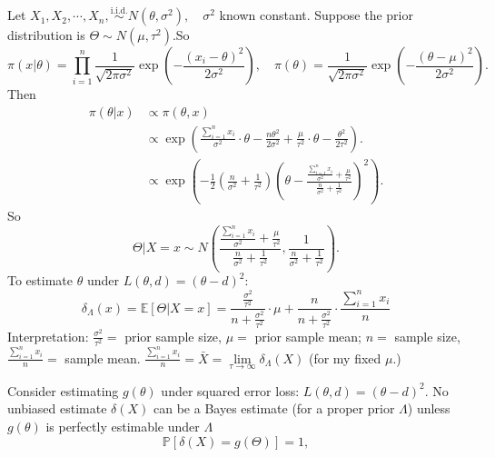 \documentclass[a4paper]{article}
\begin{document}
\begin{eg}
	Let $X_1,X_2,\cdots,X_n,\stackrel{\text{i.i.d.}}{\sim} N(\theta,\sigma^2), \quad \sigma^2$ known constant. Suppose the prior distribution is $\Theta \sim N(\mu, \tau^2)$.So
	\begin{equation*}
		\pi(x|\theta) = \prod\limits_{i=1}^n \frac{1}{\sqrt{2 \pi \sigma^2}} \exp\left(-\frac{(x_i-\theta)^2}{2\sigma^2}\right), \quad \pi(\theta) = \frac{1}{\sqrt{2 \pi \sigma^2}} \exp\left(-\frac{(\theta-\mu)^2}{2\sigma^2}\right).	
	\end{equation*}
	Then
	\begin{equation*}
		\begin{aligned}
			\pi(\theta|x) & \propto \pi (\theta,x) \\
			&\propto \exp\left(\frac{\sum\limits_{i = 1}^n x_i}{\sigma^2} \cdot \theta - \frac{n\theta^2}{2\sigma^2}+\frac{\mu}{\tau^2} \cdot \theta - \frac{\theta^2}{2\tau^2}\right). \\
			& \propto \exp\left(-\frac{1}{2}\left(\frac{n}{\sigma^2}+\frac{1}{\tau^2}\right)\left(\theta-\frac{\frac{\sum\limits_{i = 1}^n x_i}{\sigma^2} + \frac{\mu}{\tau^2}}{\frac{n}{\sigma^2}+\frac{1}{\tau^2}}\right)^2\right).
		\end{aligned}
	\end{equation*}
	So
	\begin{equation*}
		\Theta|X =  x  \sim N\left(\frac{\frac{\sum\limits_{i = 1}^n x_i}{\sigma^2} + \frac{\mu}{\tau^2}}{\frac{n}{\sigma^2}+\frac{1}{\tau^2}},\frac{1}{\frac{n}{\sigma^2}+\frac{1}{\tau^2}}\right).
	\end{equation*}
	To estimate $\theta$ under $L(\theta,d) = (\theta - d)^2$:
	\begin{equation}
		\delta_{\Lambda}(x) = \mathbb{E}[\Theta|X=x] = \frac{\frac{\sigma^2}{\tau^2}}{n + \frac{\sigma^2}{\tau^2}} \cdot \mu + \frac{n}{n + \frac{\sigma^2}{\tau^2}} \cdot \frac{\sum\limits_{i = 1}^n x_i}{n}
	\end{equation}
	Interpretation: $\frac{\sigma^2}{\tau^2} = $ prior sample size, $\mu = $ prior sample mean; $n = $ sample size, $\frac{\sum\limits_{i=1}^n x_i}{n} = $ sample mean. $\frac{\sum\limits_{i=1}^n x_i}{n} = \bar{X} = \lim\limits_{\tau \to \infty} \delta_{\Lambda}(X)$ (for my fixed $\mu$.)
\end{eg}

\begin{thm}
	Consider estimating $g(\theta)$ under squared error loss: $L(\theta,d) = (\theta - d)^2$. No unbiased estimate $\delta(X)$ can be a Bayes estimate (for a proper prior $\Lambda$) unless $g(\theta)$ is perfectly estimable under $\Lambda$
	\begin{equation}
		\mathbb{P}[\delta(X)=g(\Theta)] = 1,
	\end{equation}
\end{thm}
\end{document}
